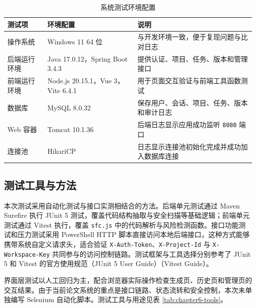 \begin{table}[!htbp]
\centering
\caption{系统测试环境配置}
\label{tab:chapter6-env}
\small
\begin{tabular}{@{}p{}p{}p{}@{}}
\toprule
测试项 & 环境配置 & 说明 \\
\midrule
操作系统 & Windows 11 64 位 & 与开发环境一致，便于复现问题与比对日志 \\
后端运行环境 & Java 17.0.12，Spring Boot 3.4.3 & 提供认证、项目、任务、版本和管理接口 \\
前端运行环境 & Node.js 20.15.1，Vue 3，Vite 6.4.1 & 用于页面交互验证与前端工具函数测试 \\
数据库 & MySQL 8.0.32 & 保存用户、会话、项目、任务、版本和审计日志 \\
Web 容器 & Tomcat 10.1.36 & 后端日志显示应用成功监听 \texttt{8080} 端口 \\
连接池 & HikariCP & 日志显示连接池初始化完成并成功加入数据库连接 \\
\bottomrule
\end{tabular}
\end{table}

\subsection{测试工具与方法}
本次测试采用自动化测试与接口实测相结合的方法。后端单元测试通过 Maven Surefire 执行 JUnit 5 测试，覆盖代码结构抽取与安全扫描等基础逻辑；前端单元测试通过 Vitest 执行，覆盖 \texttt{sfc.js} 中的代码解析与风险检测函数。接口功能测试和压力测试采用 PowerShell HTTP 脚本直接访问本地后端接口，这种方式能够携带系统自定义请求头，适合验证 \texttt{X-Auth-Token}、\texttt{X-Project-Id} 与 \texttt{X-Workspace-Key} 共同参与的访问控制链路。测试框架与工具选择分别参考了 JUnit 5 和 Vitest 的官方使用规范（JUnit 5 User Guide）（Vitest Guide）\cite{junit5docs2025}\cite{vitestdocs2025}。

界面层测试以人工回归为主，配合浏览器实际操作检查生成页、历史页和管理页的交互结果。由于当前论文系统的重点是接口链路、状态流转和安全控制，本次未单独编写 Selenium 自动化脚本。测试工具与用途见表 \ref{tab:chapter6-tools}。

